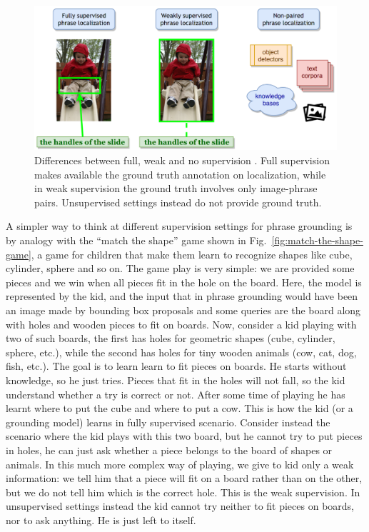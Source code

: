 \begin{figure}[H]
  \centering
  \includegraphics[width=.8\textwidth]{figures/full-weak-no-supervision.png}
  \caption[Differences between full, weak and no supervision]{
    Differences between full, weak and no supervision
    \cite{wang2019phrase}. Full supervision makes available the ground
    truth annotation on localization, while in weak supervision the
    ground truth involves only image-phrase pairs. Unsupervised
    settings instead do not provide ground truth.}
  \label{fig:full-weak-no-supervision}
\end{figure}

A simpler way to think at different supervision settings for phrase
grounding is by analogy with the ``match the shape'' game shown in
Fig.~\ref{fig:match-the-shape-game}, a game for children that make
them learn to recognize shapes like cube, cylinder, sphere and so on.
The game play is very simple: we are provided some pieces and we win
when all pieces fit in the hole on the board. Here, the model is
represented by the kid, and the input that in phrase grounding would
have been an image made by bounding box proposals and some queries are
the board along with holes and wooden pieces to fit on boards. Now,
consider a kid playing with two of such boards, the first has holes
for geometric shapes (cube, cylinder, sphere, etc.), while the second
has holes for tiny wooden animals (cow, cat, dog, fish, etc.). The
goal is to learn learn to fit pieces on boards. He starts without
knowledge, so he just tries. Pieces that fit in the holes will not
fall, so the kid understand whether a try is correct or not. After some
time of playing he has learnt where to put the cube and where to put a
cow. This is how the kid (or a grounding model) learns in fully
supervised scenario. Consider instead the scenario where the kid plays
with this two board, but he cannot try to put pieces in holes, he can
just ask whether a piece belongs to the board of shapes or animals. In
this much more complex way of playing, we give to kid only a weak
information: we tell him that a piece will fit on a board rather than
on the other, but we do not tell him which is the correct hole. This
is the weak supervision. In unsupervised settings instead the kid
cannot try neither to fit pieces on boards, nor to ask anything. He is
just left to itself.

